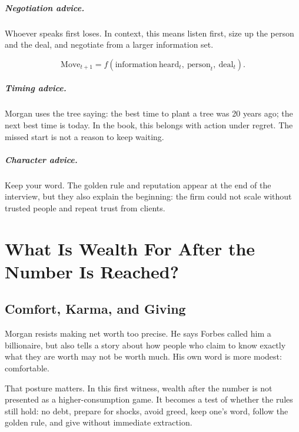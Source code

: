 \documentclass[11pt,oneside]{book}
\begin{document}
\paragraph{Negotiation advice.}
Whoever speaks first loses. In context, this means listen first, size up the person and the deal, and negotiate from a larger information set.

\begin{equation}
\mathrm{Move}_{t+1}
=
f(\mathrm{information\ heard}_{t},\ \mathrm{person}_{t},\ \mathrm{deal}_{t}).
\end{equation}

\paragraph{Timing advice.}
Morgan uses the tree saying: the best time to plant a tree was 20 years ago; the next best time is today. In the book, this belongs with action under regret. The missed start is not a reason to keep waiting.

\paragraph{Character advice.}
Keep your word. The golden rule and reputation appear at the end of the interview, but they also explain the beginning: the firm could not scale without trusted people and repeat trust from clients.

\chapter{What Is Wealth For After the Number Is Reached?}

\section{Comfort, Karma, and Giving}

Morgan resists making net worth too precise. He says Forbes called him a billionaire, but also tells a story about how people who claim to know exactly what they are worth may not be worth much. His own word is more modest: comfortable.

That posture matters. In this first witness, wealth after the number is not presented as a higher-consumption game. It becomes a test of whether the rules still hold: no debt, prepare for shocks, avoid greed, keep one's word, follow the golden rule, and give without immediate extraction.
\end{document}
